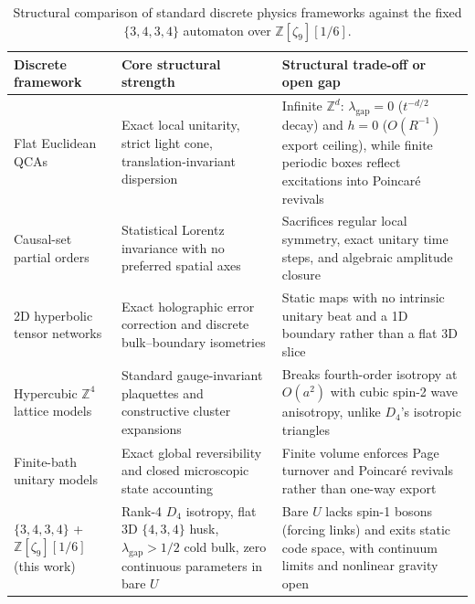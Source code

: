 \begin{table}[tb]
\centering
\caption{Structural comparison of standard discrete physics frameworks against the fixed $\{3,4,3,4\}$ automaton over
$\mathbb{Z}[\zeta_9][1/6]$.}
\label{tab:discrete-comparison}
\footnotesize
\begin{tabularx}{\textwidth}{@{}>{\raggedright\arraybackslash}p{3.20cm}>{\raggedright\arraybackslash}p{4.55cm}>{\raggedright\arraybackslash}X@{}}
\toprule
Discrete framework & Core structural strength & Structural trade-off or open gap \\
\midrule
Flat Euclidean QCAs \cite{schumacher2004, arrighi2019, farrelly2020} & Exact local unitarity, strict light cone, translation-invariant dispersion & Infinite $\mathbb{Z}^d$: $\lambda_{\mathrm{gap}} = 0$ ($t^{-d/2}$ decay) and $h = 0$ ($O(R^{-1})$ export ceiling), while finite periodic boxes reflect excitations into Poincar\'e revivals \\
\addlinespace[2pt]
Causal-set partial orders & Statistical Lorentz invariance with no preferred spatial axes & Sacrifices regular local symmetry, exact unitary time steps, and algebraic amplitude closure \\
\addlinespace[2pt]
2D hyperbolic tensor networks \cite{pastawski2015happy} & Exact holographic error correction and discrete bulk--boundary isometries & Static maps with no intrinsic unitary beat and a 1D boundary rather than a flat 3D slice \\
\addlinespace[2pt]
Hypercubic $\mathbb{Z}^4$ lattice models \cite{wilson1974, kotecky1986} & Standard gauge-invariant plaquettes and constructive cluster expansions & Breaks fourth-order isotropy at $O(a^2)$ with cubic spin-2 wave anisotropy, unlike $D_4$'s isotropic triangles \cite{celmaster1982} \\
\addlinespace[2pt]
Finite-bath unitary models \cite{page1993} & Exact global reversibility and closed microscopic state accounting & Finite volume enforces Page turnover and Poincar\'e revivals rather than one-way export \\
\addlinespace[2pt]
$\{3,4,3,4\}$ + $\mathbb{Z}[\zeta_9][1/6]$ (this work) & Rank-4 $D_4$ isotropy, flat 3D $\{4,3,4\}$ husk, $\lambda_{\mathrm{gap}} > 1/2$ cold bulk, zero continuous parameters in bare $U$ & Bare $U$ lacks spin-1 bosons (forcing links) and exits static code space, with continuum limits and nonlinear gravity open \\
\bottomrule
\end{tabularx}
\end{table}

